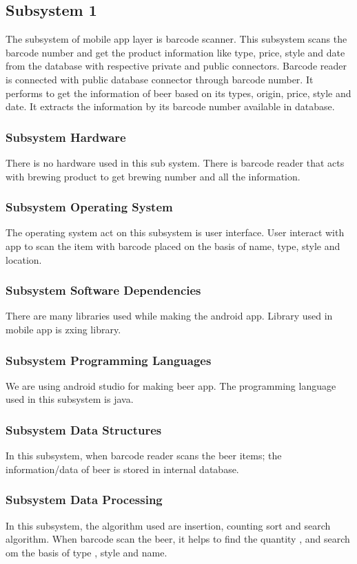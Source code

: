 \subsection{Subsystem 1}
The subsystem of mobile app layer is barcode scanner. This subsystem scans the barcode number and get the product information like type, price, style and date from the database with respective private and public connectors. Barcode reader is connected with public database connector through barcode number. It performs to get the information of beer based on its types, origin, price, style and date. It extracts the information by its barcode number available in database.

\subsubsection{Subsystem Hardware}
There is no hardware used in this sub system. There is barcode reader that acts with brewing product to get brewing number and all the information.

\subsubsection{Subsystem Operating System}
The operating system act on this subsystem is user interface. User interact with app to scan the item with barcode   placed on the basis of name, type, style and location.

\subsubsection{Subsystem Software Dependencies}
There are many libraries used while making the android app. Library used in mobile app is zxing library.

\subsubsection{Subsystem Programming Languages}
We are using android studio for making beer app. The programming language used in this subsystem is java.

\subsubsection{Subsystem Data Structures}
In this subsystem, when barcode reader scans the beer items; the information/data of beer is stored in internal database. 

\subsubsection{Subsystem Data Processing}
In this subsystem, the algorithm used are insertion, counting sort and search algorithm. When barcode scan the beer, it helps to find the quantity ,  and search om the basis of type , style and name.
